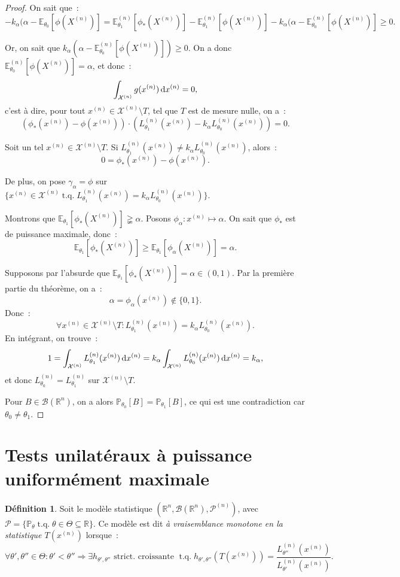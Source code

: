 \documentclass{report}
\DeclareMathOperator{\tq}{\text{ t.q. }}
\renewcommand{\P}{\mathbb P}
\newcommand{\E}{\mathbb E}
\newcommand{\statmod}[4]{\left(#1^{#4}, #2\left(#1^{#4}\right), #3^{\left(#4\right)}\right)}
\newcommand{\R}{\mathbb R}
\newcommand{\Brl}{\mathcal B}  %
\newcommand{\n}{{(n)}}
\theoremstyle{definition}
\newtheorem{déf}[thm]{Définition}
\theoremstyle{remark}
\begin{document}
		\begin{proof} On sait que~:
		\[-k_\alpha(\alpha-\E_{\theta_0}[\phi(X^\n)] = \E_{\theta_1}^\n[\phi_*(X^\n)] - \E_{\theta_1}^\n[\phi(X^\n)] - k_\alpha(\alpha - \E_{\theta_0}^\n[\phi(X^\n)]
			\geq 0.\]

		Or, on sait que $k_\alpha(\alpha-\E_{\theta_0}^\n[\phi(X^\n)]) \geq 0$. On a donc $\E_{\theta_0}^\n[\phi(X^\n)] = \alpha$, et donc~:
		\[\int_{\mathcal X^\n}g(x^\n)\dif x^\n = 0,\]
		c'est à dire, pour tout $x^\n \in \mathcal X^\n \setminus T$, tel que $T$ est de mesure nulle, on a~:
		\[\left(\phi_*(x^\n) - \phi(x^\n)\right) \cdot \left(L_{\theta_1}^\n(x^\n) - k_\alpha L_{\theta_0}^\n(x^\n)\right) = 0.\]

		Soit un tel $x^\n \in \mathcal X^\n \setminus T$. Si $L_{\theta_1}^\n(x^\n) \neq k_\alpha L_{\theta_0}^\n(x^\n)$, alors~:
		\[0 = \phi_*(x^\n) - \phi(x^\n).\]

		De plus, on pose $\gamma_\alpha = \phi$ sur $\{x^\n \in \mathcal X^\n \tq L_{\theta_1}^\n(x^\n) = k_\alpha L_{\theta_0}^\n(x^\n)\}$.

		Montrons que $\E_{\theta_1}[\phi_*(X^\n)] \gneqq \alpha$. Posons $\phi_\alpha : x^\n \mapsto \alpha$. On sait que $\phi_*$ est de puissance maximale,
		donc~:
		\[\E_{\theta_1}[\phi_*(X^\n)] \geq \E_{\theta_1}[\phi_\alpha(X^\n)] = \alpha.\]

		Supposons par l'absurde que $\E_{\theta_1}[\phi_*(X^\n)] = \alpha \in (0, 1)$. Par la première partie du théorème, on a~:
		\[\alpha = \phi_\alpha(x^\n) \not \in \{0, 1\}.\]
		Donc~:
		\[\forall x^\n \in \mathcal X^\n \setminus T : L_{\theta_1}^\n(x^\n) = k_\alpha L_{\theta_0}^\n(x^\n).\]
		En intégrant, on trouve~:
		\[1 = \int_{\mathcal X^\n}L_{\theta_1}^\n(x^\n)\dif x^\n = k_\alpha\int_{\mathcal X^\n}L_{\theta_0}^\n(x^\n)\dif x^\n = k_\alpha,\]
		et donc $L_{\theta_0}^\n = L_{\theta_1}^\n$ sur $\mathcal X^\n \setminus T$.

		Pour $B \in \Brl(\R^n)$, on a alors $\P_{\theta_0}[B] = \P_{\theta_1}[B]$, ce qui est une contradiction car $\theta_0 \neq \theta_1$.
		\end{proof}

	\section{Tests unilatéraux à puissance uniformément maximale}
		\begin{déf} Soit le modèle statistique $\statmod \R\Brl{\mathcal P}n$, avec $\mathcal P = \{\P_\theta \tq \theta \in \Theta \subseteq \R\}$.
		Ce modèle est dit \textit{à vraisemblance monotone en la statistique $T(x^\n)$} lorsque~:
		\[\forall \theta', \theta'' \in \Theta : \theta' < \theta'' \Rightarrow \exists h_{\theta', \theta''} \text{ strict. croissante } \tq
			h_{\theta', \theta''}(T(x^\n)) = \frac {L_{\theta''}^\n(x^\n)}{L_{\theta'}^\n(x^\n)}.\]
		\end{déf}
\end{document}
